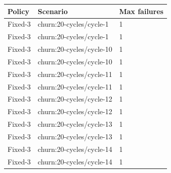 \begin{tabular}{lll}
\hline
Policy & Scenario & Max failures \\
\hline
Fixed-3 & churn:20-cycles/cycle-1 & 1 \\
Fixed-3 & churn:20-cycles/cycle-1 & 1 \\
Fixed-3 & churn:20-cycles/cycle-10 & 1 \\
Fixed-3 & churn:20-cycles/cycle-10 & 1 \\
Fixed-3 & churn:20-cycles/cycle-11 & 1 \\
Fixed-3 & churn:20-cycles/cycle-11 & 1 \\
Fixed-3 & churn:20-cycles/cycle-12 & 1 \\
Fixed-3 & churn:20-cycles/cycle-12 & 1 \\
Fixed-3 & churn:20-cycles/cycle-13 & 1 \\
Fixed-3 & churn:20-cycles/cycle-13 & 1 \\
Fixed-3 & churn:20-cycles/cycle-14 & 1 \\
Fixed-3 & churn:20-cycles/cycle-14 & 1 \\
\hline
\end{tabular}
